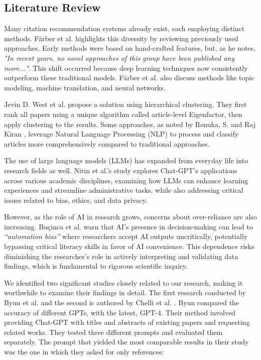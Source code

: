 \documentclass[runningheads]{llncs}
\begin{document}

\subsection{Literature Review}\label{literature}

Many citation recommendation systems already exist, each employing distinct methods. Färber et al. \cite{farber_2020} highlights this diversity by reviewing previously used approaches. Early methods were based on hand-crafted features, but, as he notes, \textit{"In recent years, no novel approaches of this group have been published any more..."}. This shift occurred because deep learning techniques now consistently outperform these traditional models. Färber et al. also discuss methods like topic modeling, machine translation, and neural networks.

Jevin D. West et al. \cite{jevin_2016} propose a solution using hierarchical clustering. They first rank all papers using a unique algorithm called article-level Eigenfactor, then apply clustering to the results. Some approaches, as noted by Renuka, S. and Raj Kiran \cite{Renuka_2021}, leverage Natural Language Processing (NLP) to process and classify articles more comprehensively compared to traditional approaches.

The use of large language models (LLMs) has expanded from everyday life into research fields as well. Nitin et al.'s study \cite{Rane_2023} explores Chat-GPT’s applications across various academic disciplines, examining how LLMs can enhance learning experiences and streamline administrative tasks, while also addressing critical issues related to bias, ethics, and data privacy.

However, as the role of AI in research grows, concerns about over-reliance are also increasing. Buçinca et al. \cite{buccinca_2021} warn that AI’s presence in decision-making can lead to \textit{“automation bias”} where researchers accept AI outputs uncritically, potentially bypassing critical literacy skills in favor of AI convenience. This dependence risks diminishing the researcher’s role in actively interpreting and validating data findings, which is fundamental to rigorous scientific inquiry. 

We identified two significant studies closely related to our research, making it worthwhile to examine their findings in detail. The first research conducted by Byun et al. \cite{byun-etal-2024-reference} and the second is authored by Chelli et al. \cite{Chelli_2024}. Byun compared the accuracy of different GPTs, with the latest, GPT-4. Their method involved providing Chat-GPT with titles and abstracts of existing papers and requesting related works. They tested three different prompts and evaluated them separately. The prompt that yielded the most comparable results in their study was the one in which they asked for only references:
\end{document}
